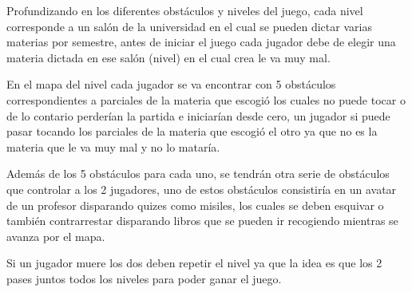 \documentclass{article}
\begin{document}
Profundizando en los diferentes obstáculos y niveles del juego,
cada nivel corresponde a un salón de la universidad en el cual se pueden dictar varias materias por semestre, antes de iniciar el juego cada jugador debe de elegir una materia dictada en ese salón (nivel) en el cual crea le va muy mal.

En el mapa del nivel cada jugador se va encontrar con 5 obstáculos correspondientes a parciales de la materia que escogió los cuales no puede tocar o de lo contario perderían la partida e iniciarían desde cero, un jugador si puede pasar tocando los parciales de la materia que escogió el otro ya que no es la materia que le va muy mal y no lo mataría.

Además de los 5 obstáculos para cada uno, se tendrán otra serie de obstáculos que controlar a los 2 jugadores, uno de estos obstáculos consistiría en un avatar de un profesor disparando quizes como misiles, los cuales se deben esquivar o también contrarrestar disparando libros que se pueden ir recogiendo mientras se avanza por el mapa.

Si un jugador muere los dos deben repetir el nivel ya que la idea es que los 2 pases juntos todos los niveles para poder ganar el juego.
\end{document}
